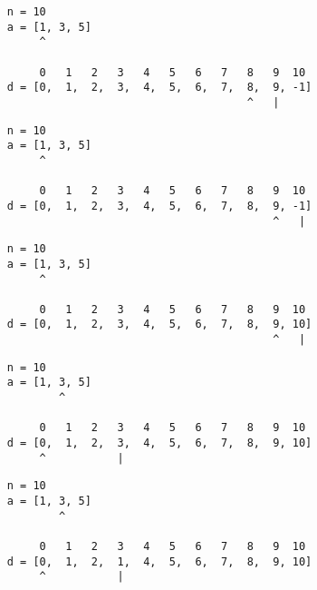\begin{frame}[fragile]
\begin{verbatim}
     n = 10
     a = [1, 3, 5]
          ^

          0   1   2   3   4   5   6   7   8   9  10
     d = [0,  1,  2,  3,  4,  5,  6,  7,  8,  9, -1]
                                          ^   |
\end{verbatim}
\end{frame}
\addtocounter{framenumber}{-1}

\begin{frame}[fragile]
\begin{verbatim}
     n = 10
     a = [1, 3, 5]
          ^

          0   1   2   3   4   5   6   7   8   9  10
     d = [0,  1,  2,  3,  4,  5,  6,  7,  8,  9, -1]
                                              ^   |
\end{verbatim}
\end{frame}
\addtocounter{framenumber}{-1}

\begin{frame}[fragile]
\begin{verbatim}
     n = 10
     a = [1, 3, 5]
          ^

          0   1   2   3   4   5   6   7   8   9  10
     d = [0,  1,  2,  3,  4,  5,  6,  7,  8,  9, 10]
                                              ^   |
\end{verbatim}
\end{frame}
\addtocounter{framenumber}{-1}

\begin{frame}[fragile]
\begin{verbatim}
     n = 10
     a = [1, 3, 5]
             ^

          0   1   2   3   4   5   6   7   8   9  10
     d = [0,  1,  2,  3,  4,  5,  6,  7,  8,  9, 10]
          ^           |
\end{verbatim}
\end{frame}
\addtocounter{framenumber}{-1}

\begin{frame}[fragile]
\begin{verbatim}
     n = 10
     a = [1, 3, 5]
             ^

          0   1   2   3   4   5   6   7   8   9  10
     d = [0,  1,  2,  1,  4,  5,  6,  7,  8,  9, 10]
          ^           |
\end{verbatim}
\end{frame}
\addtocounter{framenumber}{-1}

